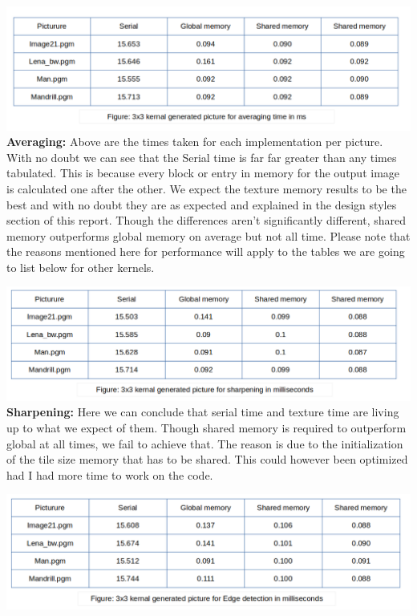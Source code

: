 \includegraphics[scale=0.5]{Performance/averaging3.png}
\\
\textbf{Averaging: }Above are the times taken for each implementation per picture. With no doubt we can see that the Serial time is far far greater than any times tabulated. This is because every block or entry in memory for the output image is calculated one after the other.
We expect the texture memory results to be the best and with no doubt they are as expected and explained in the design styles section of this report. Though the differences aren't significantly different, shared memory outperforms global memory on average but not all time. Please note that the reasons mentioned here for performance will apply to the tables we are going to list below for other kernels.

\includegraphics[scale=0.5]{Performance/sharpening.png}
\textbf{Sharpening: }Here we can conclude that serial time and texture time are living up to what we expect of them. Though shared memory is required to outperform global at all times, we fail to achieve that. The reason is due to the initialization of the tile size memory that has to be shared. This could however been optimized had I had more time to work on the code. 

\includegraphics[scale=0.5]{Performance/edgeDetection.png}


 
 

